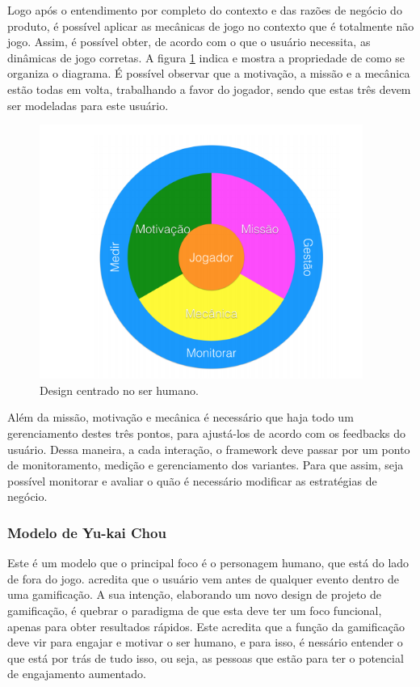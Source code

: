 Logo após o entendimento por completo do contexto e das razões de negócio do
produto, é possível aplicar as mecânicas de jogo no contexto que é totalmente
não jogo. Assim, é possível obter, de acordo com o que o usuário necessita, as
dinâmicas de jogo corretas. A figura \ref{fig:Kumar} indica e mostra a propriedade de
como se organiza o diagrama. É possível observar que a motivação, a missão e a
mecânica estão todas em volta, trabalhando a favor do jogador, sendo que estas
três devem ser modeladas para este usuário.

\begin{figure}[h]
    \centering
    \includegraphics[width=400px, scale=1]{figuras/kumar}
    \caption{ Design centrado no ser humano.}
    \label{fig:Kumar}
\end{figure}

Além da missão, motivação e mecânica é necessário que haja todo um gerenciamento
destes três pontos, para ajustá-los de acordo com os feedbacks do usuário. Dessa
maneira, a cada interação, o framework deve passar por um ponto de monitoramento,
medição e gerenciamento dos variantes. Para que assim, seja possível monitorar e
avaliar o quão é necessário modificar as estratégias de negócio.

\subsubsection{Modelo de Yu-kai Chou}
\label{sub:modelodeyu-kaichou}
Este é um modelo que o principal foco é o personagem humano, que está do lado
de fora do jogo. \cite{chou2015actionable} acredita que o usuário vem antes de qualquer evento
dentro de uma gamificação. A sua intenção, elaborando um novo design de projeto
de gamificação, é quebrar o paradigma de que esta deve ter um foco funcional,
apenas para obter resultados rápidos. Este acredita que a função da gamificação
deve vir para engajar e motivar o ser humano, e para isso, é nessário entender o
que está por trás de tudo isso, ou seja, as pessoas que estão para ter o
potencial de engajamento aumentado.

